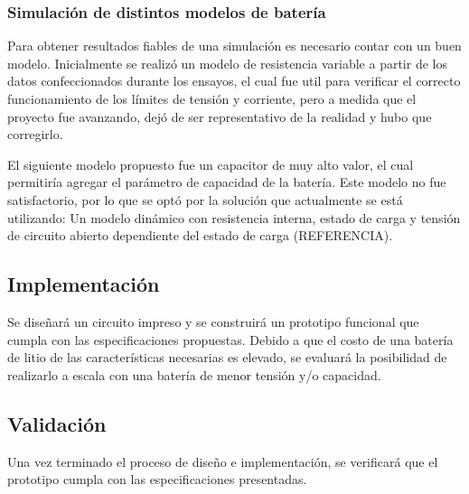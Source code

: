 \subsubsection{Simulación de distintos modelos de batería}
Para obtener resultados fiables de una simulación es necesario contar con un buen modelo.
Inicialmente se realizó un modelo de resistencia variable a partir de los datos confeccionados durante los ensayos,
el cual fue util para verificar el correcto funcionamiento de los límites de tensión y corriente,
pero a medida que el proyecto fue avanzando, dejó de ser representativo de la realidad y hubo que corregirlo.

El siguiente modelo propuesto fue un capacitor de muy alto valor, el cual permitiría agregar el parámetro de capacidad
de la batería. Este modelo no fue satisfactorio, por lo que se optó por la solución que actualmente se está utilizando:
Un modelo dinámico con resistencia interna, estado de carga y tensión de circuito abierto dependiente del estado de carga (REFERENCIA).


\subsection{Implementación}
Se diseñará un circuito impreso y se construirá un prototipo funcional que cumpla con las especificaciones propuestas. 
Debido a que el costo de una batería de litio de las características necesarias es elevado,
se evaluará la posibilidad de realizarlo a escala con una batería de menor tensión y/o capacidad.

\subsection{Validación}
Una vez terminado el proceso de diseño e implementación,
se verificará que el prototipo cumpla con las especificaciones presentadas.